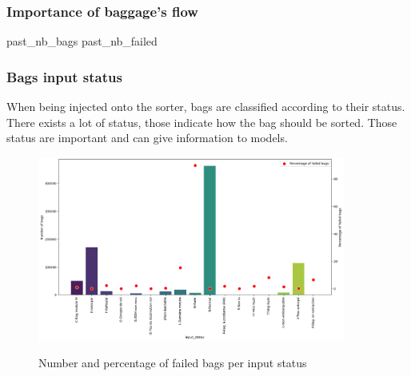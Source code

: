 \documentclass[12pt]{article}
\begin{document}
\subsubsection{Importance of baggage's flow}
past\_nb\_bags
past\_nb\_failed

\subsubsection{Bags input status}
When being injected onto the sorter, bags are classified according to their status. There exists a lot of status, those indicate how the bag should be sorted. Those status are important and can give information to models.

\begin{figure}[h]
    \centering
    \includegraphics[width=0.9\textwidth]{failed bags per input status.png}\\
    \caption{Number and percentage of failed bags per input status}
    \label{fig:Number and percentage of failed bags per input status}
\end{figure}
\FloatBarrier
\end{document}
